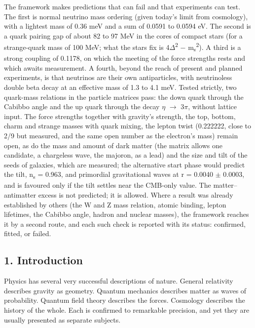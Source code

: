\documentclass[
  11pt,
]{article}
\begin{document}
The framework makes predictions that can fail and that experiments can test. The first is normal neutrino mass ordering (given today's limit from cosmology), with a lightest mass of 0.36 meV and a sum of 0.0591 to 0.0594 eV. The second is a quark pairing gap of about 82 to 97 MeV in the cores of compact stars (for a strange-quark mass of 100 MeV; what the stars fix is 4\ensuremath{\Delta}\textsuperscript{2} \ensuremath{-} m\textsubscript{s}\textsuperscript{2}). A third is a strong coupling of 0.1178, on which the meeting of the force strengths rests and which awaits measurement. A fourth, beyond the reach of present and planned experiments, is that neutrinos are their own antiparticles, with neutrinoless double beta decay at an effective mass of 1.3 to 4.1 meV. Tested strictly, two quark-mass relations in the particle matrices pass: the down quark through the Cabibbo angle and the up quark through the decay \ensuremath{\eta} \ensuremath{\to} 3\ensuremath{\pi}, without lattice input. The force strengths together with gravity's strength, the top, bottom, charm and strange masses with quark mixing, the lepton twist (0.222222, close to 2/9 but measured, and the same open number as the electron's mass) remain open, as do the mass and amount of dark matter (the matrix allows one candidate, a chargeless wave, the majoron, as a lead) and the size and tilt of the seeds of galaxies, which are measured; the alternative start phase would predict the tilt, n\textsubscript{s} = 0.963, and primordial gravitational waves at r = 0.0040 \ensuremath{\pm} 0.0003, and is favoured only if the tilt settles near the CMB-only value. The matter--antimatter excess is not predicted; it is allowed. Where a result was already established by others (the W and Z mass relation, atomic binding, lepton lifetimes, the Cabibbo angle, hadron and nuclear masses), the framework reaches it by a second route, and each such check is reported with its status: confirmed, fitted, or failed.

\hypertarget{introduction}{%
\subsection{1. Introduction}\label{introduction}}

Physics has several very successful descriptions of nature. General relativity describes gravity as geometry. Quantum mechanics describes matter as waves of probability. Quantum field theory describes the forces. Cosmology describes the history of the whole. Each is confirmed to remarkable precision, and yet they are usually presented as separate subjects.
\end{document}
